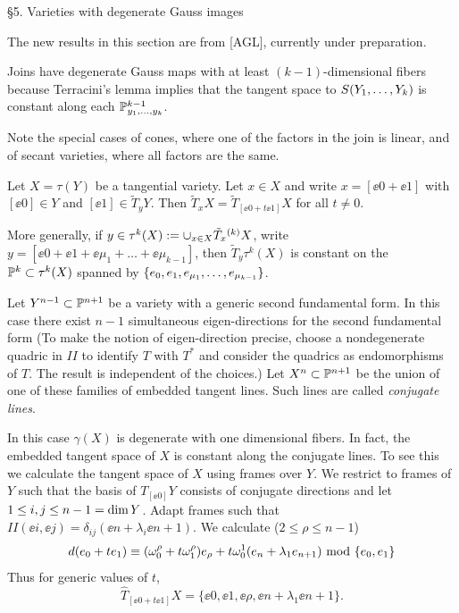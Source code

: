 \heading \S 5. Varieties with degenerate Gauss images\endheading

The new results in this section are from [AGL], currently under
preparation.

 



    Joins have degenerate
Gauss maps with at least $(k-1)$-dimensional fibers
because
  Terracini's lemma implies that 
the tangent space to $S(Y_1, \hdots , Y_k)$ is constant
along each $\Bbb P^{k-1}_{y_1, \hdots , y_k}$.

Note the special cases of cones, where one of the factors
in the join is linear, and of secant varieties, where
all factors are the same.


 


  Let $X=\tau (Y)$ be
a tangential variety. Let $x\in X$ and write $x=[\ee 0+\ee 1]$
with $[\ee 0]\in Y$ and $[\ee 1]\in\tilde T_yY$.
Then $\tilde T_xX=
\tilde T_{[ \ee 0+t\ee 1]}X$ for all $t\neq 0$.
 
 More generally, if $y\in \tau ^k(X):=\cup_{x\in X}\tilde T_x{}^{({k})} X$,
write $y=[\ee 0+\ee 1 +\ee{\mu_1}+\hdots+\ee{\mu_{k-1}}]$,
then
$\tilde T_y\tau^k(X)$ is constant on the  $\Bbb P^{k}\subset\tau^k(X)$
spanned by $\{ e_{0},e_{1} ,e_{\mu_1}, \hdots , e_{\mu_{k-1}}\}$.


 Let $Y^{n-1}\subset\Bbb P^{n+1}$ be
a variety with a generic second fundamental form. In this case there exist
$n-1$ simultaneous eigen-directions for the second fundamental form 
(To make the notion of eigen-direction
  precise, choose a nondegenerate quadric in $II$ to identify
$T$ with $T^*$ and consider the quadrics as endomorphisms of $T$.
The result is independent of the choices.) 
Let $X^{n}\subset\Bbb P^{n+1}$ be the union of one of these families
of embedded tangent lines.  Such lines are called {\it conjugate lines}.

 In this case  $\gamma (X)$ is degenerate with one dimensional
fibers. In fact, the embedded tangent space of $X$ is constant along
the conjugate lines. To see this we calculate the tangent
space of $X$ using frames over $Y$. We restrict to frames of
$Y$ such that the basis of $T_{[\ee 0]}Y$ consists of conjugate directions
and let $1\leq i,j\leq n-1=\text{dim}\, Y$.
Adapt frames such that $II (\ee i, \ee j)=\delta_{ij} (\ee n +
\lambda_i\ee{n+1})$. We calculate ($2\leq \rho\leq n-1$)
$$
d(e_{0}+te_{1})\equiv
(\omega^{\rho}_0 + t\omega^{\rho}_{1})e_{\rho} +t\omega^{1}_0(e_{n}+ \lambda_1e_{n+1})
\text{ mod } \{e_{0},e_{1}\}
$$
Thus  for generic values of $t$,
$$
\hat T_{[\ee 0+t\ee 1]}X=\{\ee 0,\ee 1,\ee\rho, \ee n+\lambda_1\ee{n+1}\}.
$$

